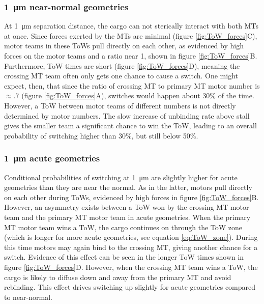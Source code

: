 \subsubsection*{\SI{1}{\micro\meter} near-normal geometries}

At \SI{1}{\micro\meter} separation distance, the cargo can not sterically interact with both MTs at once. Since forces exerted by the MTs are minimal (figure \ref{fig:ToW_forces}C), motor teams in these ToWs pull directly on each other, as evidenced by high forces on the motor teams and a ratio near 1, shown in figure \ref{fig:ToW_forces}B. Furthermore, ToW times are short (figure \ref{fig:ToW_forces}D), meaning the crossing MT team often only gets one chance to cause a switch. One might expect, then, that since the ratio of crossing MT to primary MT motor number is $\approx .7$ (figure \ref{fig:ToW_forces}A), switches would happen about 30\% of the time. However, a ToW between motor teams of different numbers is not directly determined by motor numbers. The slow increase of unbinding rate above stall gives the smaller team a significant chance to win the ToW, leading to an overall probability of switching higher than 30\%, but still below 50\%.

\subsubsection*{\SI{1}{\micro\meter} acute geometries}

Conditional probabilities of switching at \SI{1}{\micro\meter} are slightly higher for acute geometries  than they are near the normal. As in the latter, motors pull directly on each other during ToWs, evidenced by high forces in figure \ref{fig:ToW_forces}B. However, an asymmetry exists between a ToW won by the crossing MT motor team and the primary MT motor team in acute geometries. When the primary MT motor team wins a ToW, the cargo continues on through the ToW zone (which is longer for more acute geometries, see equation \ref{eq:ToW_zone}). During this time motors may again bind to the crossing MT, giving another chance for a switch. Evidence of this effect can be seen in the longer ToW times shown in figure \ref{fig:ToW_forces}D. However, when the crossing MT team wins a ToW, the cargo is likely to diffuse down and away from the primary MT and avoid rebinding. This effect drives switching up slightly for acute geometries compared to near-normal.

